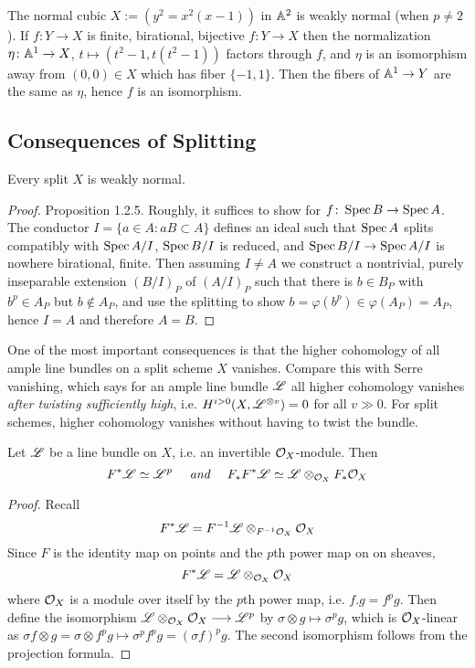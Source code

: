 \documentclass[12pt]{article}
\begin{document}
The normal cubic $X := (y^2 = x^2(x-1))$ in $\mathbb{A}^2$ is weakly normal (when $p \neq 2$). If $f \colon Y \to X$ is finite, birational, bijective $f \colon Y \to X$ then the normalization $\eta \colon \mathbb{A}^1 \to X$, $t \mapsto (t^2-1,t(t^2-1))$ factors through $f$, and $\eta$ is an isomorphism away from $(0,0) \in X$ which has fiber $\{-1,1\}$. Then the fibers of $\mathbb{A}^1 \to Y$ are the same as $\eta$, hence $f$ is an isomorphism.

\subsection{Consequences of Splitting}

\begin{prop}
    Every split $X$ is weakly normal.
\end{prop}
\begin{proof}
    \cite{Brion2004FrobeniusSM} Proposition 1.2.5. Roughly, it suffices to show for $f \colon \operatorname{Spec} B \to \operatorname{Spec} A$. The conductor $I = \{a \in A \colon aB \subset A\}$ defines an ideal such that $\operatorname{Spec} A$ splits compatibly with $\operatorname{Spec} A/I$, $\operatorname{Spec} B/I$ is reduced, and $\operatorname{Spec} B/I \to \operatorname{Spec} A/I$ is nowhere birational, finite. Then assuming $I \neq A$ we construct a nontrivial, purely inseparable extension $(B/I)_P$ of $(A/I)_P$ such that there is $b \in B_P$ with $b^p \in A_P$ but $b \not \in A_P$, and use the splitting to show $b = \varphi(b^p) \in \varphi(A_P) = A_P$, hence $I = A$ and therefore $A = B$.
\end{proof}

One of the most important consequences is that the higher cohomology of all ample line bundles on a split scheme $X$ vanishes. Compare this with Serre vanishing, which says for an ample line bundle $\mathscr{L}$ all higher cohomology vanishes \textit{after twisting sufficiently high}, i.e. $H^{i > 0}(X,\mathscr{L}^{\otimes v}) = 0$ for all $v \gg 0$. For split schemes, higher cohomology vanishes without having to twist the bundle.

\begin{lem}\label{bklem1.2.6}
    Let $\mathscr{L}$ be a line bundle on $X$, i.e. an invertible $\mathcal{O}_X$-module. Then
    \[F^* \mathscr{L} \simeq \mathscr{L}^p \quad\textit{ and }\quad F_*F^* \mathscr{L} \simeq \mathscr{L} \otimes_{\mathcal{O}_X} F_* \mathcal{O}_X \]
\end{lem}
\begin{proof}
    Recall
    \[F^* \mathscr{L} = F^{-1} \mathscr{L} \otimes_{F^{-1} \mathcal{O}_X} \mathcal{O}_X\]
    Since $F$ is the identity map on points and the $p$th power map on on sheaves, 
    \[F^* \mathscr{L} = \mathscr{L} \otimes_{\mathcal{O}_X} \mathcal{O}_X\]
    where $\mathcal{O}_X$ is a module over itself by the $p$th power map, i.e. $f.g = f^pg$. Then define the isomorphism $\mathscr{L} \otimes_{\mathcal{O}_X} \mathcal{O}_X \longrightarrow \mathscr{L}^p$ by $\sigma \otimes g \mapsto \sigma^p g$, which is $\mathcal{O}_X$-linear as $\sigma f \otimes g = \sigma \otimes f^p g \mapsto \sigma^p f^p g = (\sigma f)^p g$. The second isomorphism follows from the projection formula.
\end{proof}
\end{document}
